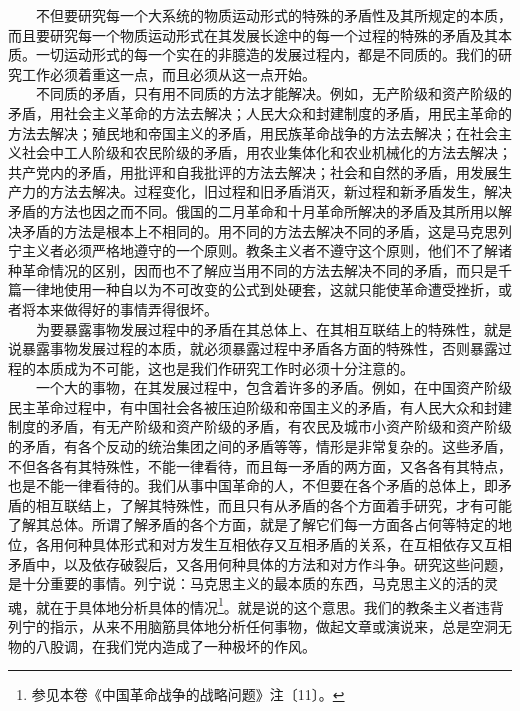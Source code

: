 \documentclass[cn,11pt,chinese]{elegantbook}
\begin{document}
　　不但要研究每一个大系统的物质运动形式的特殊的矛盾性及其所规定的本质，而且要研究每一个物质运动形式在其发展长途中的每一个过程的特殊的矛盾及其本质。一切运动形式的每一个实在的非臆造的发展过程内，都是不同质的。我们的研究工作必须着重这一点，而且必须从这一点开始。\\
　　不同质的矛盾，只有用不同质的方法才能解决。例如，无产阶级和资产阶级的矛盾，用社会主义革命的方法去解决；人民大众和封建制度的矛盾，用民主革命的方法去解决；殖民地和帝国主义的矛盾，用民族革命战争的方法去解决；在社会主义社会中工人阶级和农民阶级的矛盾，用农业集体化和农业机械化的方法去解决；共产党内的矛盾，用批评和自我批评的方法去解决；社会和自然的矛盾，用发展生产力的方法去解决。过程变化，旧过程和旧矛盾消灭，新过程和新矛盾发生，解决矛盾的方法也因之而不同。俄国的二月革命和十月革命所解决的矛盾及其所用以解决矛盾的方法是根本上不相同的。用不同的方法去解决不同的矛盾，这是马克思列宁主义者必须严格地遵守的一个原则。教条主义者不遵守这个原则，他们不了解诸种革命情况的区别，因而也不了解应当用不同的方法去解决不同的矛盾，而只是千篇一律地使用一种自以为不可改变的公式到处硬套，这就只能使革命遭受挫折，或者将本来做得好的事情弄得很坏。\\
　　为要暴露事物发展过程中的矛盾在其总体上、在其相互联结上的特殊性，就是说暴露事物发展过程的本质，就必须暴露过程中矛盾各方面的特殊性，否则暴露过程的本质成为不可能，这也是我们作研究工作时必须十分注意的。\\
　　一个大的事物，在其发展过程中，包含着许多的矛盾。例如，在中国资产阶级民主革命过程中，有中国社会各被压迫阶级和帝国主义的矛盾，有人民大众和封建制度的矛盾，有无产阶级和资产阶级的矛盾，有农民及城市小资产阶级和资产阶级的矛盾，有各个反动的统治集团之间的矛盾等等，情形是非常复杂的。这些矛盾，不但各各有其特殊性，不能一律看待，而且每一矛盾的两方面，又各各有其特点，也是不能一律看待的。我们从事中国革命的人，不但要在各个矛盾的总体上，即矛盾的相互联结上，了解其特殊性，而且只有从矛盾的各个方面着手研究，才有可能了解其总体。所谓了解矛盾的各个方面，就是了解它们每一方面各占何等特定的地位，各用何种具体形式和对方发生互相依存又互相矛盾的关系，在互相依存又互相矛盾中，以及依存破裂后，又各用何种具体的方法和对方作斗争。研究这些问题，是十分重要的事情。列宁说：马克思主义的最本质的东西，马克思主义的活的灵魂，就在于具体地分析具体的情况\footnote[11]{ 参见本卷《中国革命战争的战略问题》注〔11〕。}。就是说的这个意思。我们的教条主义者违背列宁的指示，从来不用脑筋具体地分析任何事物，做起文章或演说来，总是空洞无物的八股调，在我们党内造成了一种极坏的作风。\\
\end{document}
